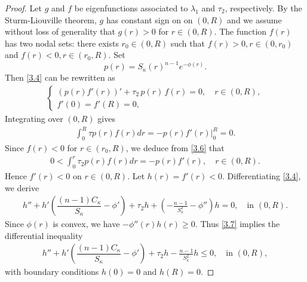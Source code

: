 \documentclass[11pt,leqno]{amsart}
\def\k{\kappa}
\def\l{\lambda}
\def\k{\kappa}
\numberwithin{equation}{section}
\begin{document}
\begin{proof}
 Let $g$ and $f$ be eigenfunctions associated to $\l_1$ and $\tau_2$, respectively.
By the Sturm-Liouville theorem,  $g$ has constant sign on on $(0,R)$ and we assume without loss of generality that $g(r)>0$ for $r\in (0,R)$. The function $f(r)$ has two nodal sets: there exists $r_{0}\in (0,R)$ such that $f(r)>0,r\in (0,r_{0})$ and $f(r)<0,r\in (r_{0},R)$.
Set
$$
p(r)=S_{\k}(r)^{n-1}e^{-\phi(r)}.
$$
Then  \eqref{3.4} can be rewritten as 
\begin{align*}
\begin{cases}
\left(p(r)f'(r)\right)' + \tau_2 \,p(r)\,f(r) = 0, \quad r\in (0, R),\\
f'(0) = f'(R) = 0,
\end{cases}
\end{align*}
Integrating over $(0,R)$ gives
\begin{align}\label{3.6}
    \int_{0}^{R}\tau p(r)f(r)dr=-p(r)f'(r)\Big|_{0}^{R}=0.
\end{align}
Since $f(r)<0$ for $r\in (r_{0},R)$, we deduce from \eqref{3.6} that
\begin{align*}
    0<\int_{0}^{r}\tau_2 p(r)f(r)dr=-p(r)f'(r), \quad r\in (0, R).
\end{align*}
 Hence $f'(r)<0 $ on $ r\in (0,R)$.
Let $h(r)=f'(r)<0$. Differentiating \eqref{3.4}, we derive
\begin{align}\label{3.7}
   h'' + h'\left(\dfrac{(n-1)C_{\kappa}}{S_{\kappa}} - \phi'\right) + \tau_2 h+(-\frac{n-1}{S_{\k}^{2}}-\phi'')h = 0, \quad \text{in } (0,R).
\end{align}
Since $\phi(r)$ is convex, we have $-\phi''(r)h(r)\geq 0$.  Thus  \eqref{3.7} implies the differential inequality
\begin{align}\label{3.8}
    h'' + h'\left(\dfrac{(n-1)C_{\kappa}}{S_{\kappa}} - \phi'\right) + \tau_2 h-\frac{n-1}{S_{\k}^{2}}h \leq  0, \quad \text{in } (0,R),
\end{align}
with boundary conditions  $h(0)=0$ and $h(R)=0$.


\end{proof}
\end{document}
